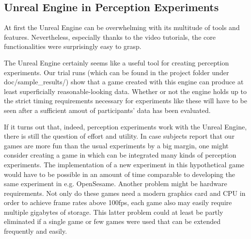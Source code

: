 \documentclass[11pt,a4paper]{article}
\begin{document}
 
        \subsection{Unreal Engine in Perception Experiments}
        
        	At first the Unreal Engine can be overwhelming with its multitude of tools and features. Nevertheless, especially thanks to the video tutorials, the core functionalities were surprisingly easy to grasp. 
        
        	The Unreal Engine certainly seems like a useful tool for creating perception experiments. Our trial runs (which can be found in the project folder under doc/sample\_results/) show that a game created with this engine can produce at least superficially reasonable-looking data. Whether or not the engine holds up to the strict timing requirements necessary for experiments like these will have to be seen after a sufficient amout of participants' data has been evaluated.
            
            If it turns out that, indeed, perception experiments work with the Unreal Engine, there is still the question of effort and utility. In case subjects report that our games are more fun than the usual experiments by a big margin, one might consider creating a game in which can be integrated many kinds of perception experiments. The implementation of a new experiment in this hypothetical game would have to be possible in an amount of time comparable to developing the same experiment in e.g. OpenSesame. Another problem might be hardware requirements. Not only do these games need a modern graphics card and CPU in order to achieve frame rates above 100fps, each game also may easily require multiple gigabytes of storage. This latter problem could at least be partly eliminated if a single game or few games were used that can be extended frequently and easily.
    
        
\end{document}
